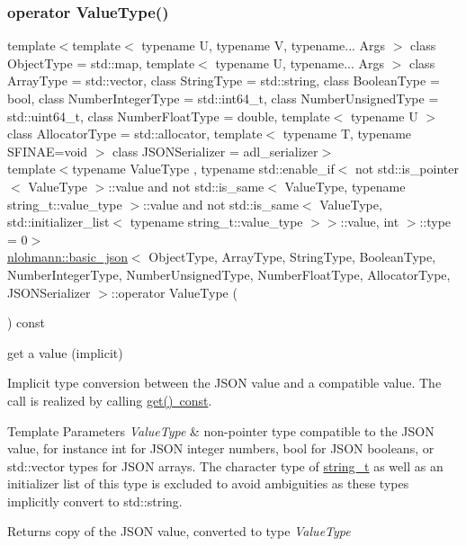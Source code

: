 \subsubsection{\texorpdfstring{operator ValueType()}{operator ValueType()}}
{\footnotesize\ttfamily template$<$template$<$ typename U, typename V, typename... Args $>$ class Object\+Type = std\+::map, template$<$ typename U, typename... Args $>$ class Array\+Type = std\+::vector, class String\+Type  = std\+::string, class Boolean\+Type  = bool, class Number\+Integer\+Type  = std\+::int64\+\_\+t, class Number\+Unsigned\+Type  = std\+::uint64\+\_\+t, class Number\+Float\+Type  = double, template$<$ typename U $>$ class Allocator\+Type = std\+::allocator, template$<$ typename T, typename S\+F\+I\+N\+A\+E=void $>$ class J\+S\+O\+N\+Serializer = adl\+\_\+serializer$>$ \\
template$<$typename Value\+Type , typename std\+::enable\+\_\+if$<$ not std\+::is\+\_\+pointer$<$ Value\+Type $>$\+::value and not std\+::is\+\_\+same$<$ Value\+Type, typename string\+\_\+t\+::value\+\_\+type $>$\+::value and not std\+::is\+\_\+same$<$ Value\+Type, std\+::initializer\+\_\+list$<$ typename string\+\_\+t\+::value\+\_\+type $>$$>$\+::value, int $>$\+::type  = 0$>$ \\
\mbox{\hyperlink{classnlohmann_1_1basic__json}{nlohmann\+::basic\+\_\+json}}$<$ Object\+Type, Array\+Type, String\+Type, Boolean\+Type, Number\+Integer\+Type, Number\+Unsigned\+Type, Number\+Float\+Type, Allocator\+Type, J\+S\+O\+N\+Serializer $>$\+::operator Value\+Type (\begin{DoxyParamCaption}{ }\end{DoxyParamCaption}) const\hspace{0.3cm}{\ttfamily [inline]}}



get a value (implicit) 

Implicit type conversion between the J\+S\+ON value and a compatible value. The call is realized by calling \mbox{\hyperlink{classnlohmann_1_1basic__json_a6b187a22994c12c8cae0dd5ee99dc85e}{get() const}}.


\begin{DoxyTemplParams}{Template Parameters}
{\em Value\+Type} & non-\/pointer type compatible to the J\+S\+ON value, for instance {\ttfamily int} for J\+S\+ON integer numbers, {\ttfamily bool} for J\+S\+ON booleans, or {\ttfamily std\+::vector} types for J\+S\+ON arrays. The character type of \mbox{\hyperlink{classnlohmann_1_1basic__json_a61f8566a1a85a424c7266fb531dca005}{string\+\_\+t}} as well as an initializer list of this type is excluded to avoid ambiguities as these types implicitly convert to {\ttfamily std\+::string}.\\
\hline
\end{DoxyTemplParams}
\begin{DoxyReturn}{Returns}
copy of the J\+S\+ON value, converted to type {\itshape Value\+Type} 
\end{DoxyReturn}

